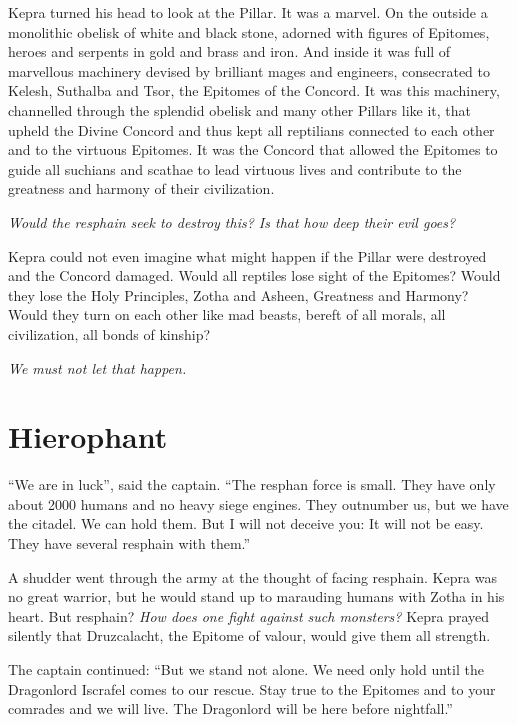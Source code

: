 \documentclass
  [a4paper,
   12pt,
   oneside
  ]%
  {article}
\begin{document}
Kepra turned his head to look at the Pillar. It was a marvel. On the outside a monolithic obelisk of white and black stone, adorned with figures of Epitomes, heroes and serpents in gold and brass and iron. And inside it was full of marvellous machinery devised by brilliant mages and engineers, consecrated to Kelesh, Suthalba and Tsor, the Epitomes of the Concord. It was this machinery, channelled through the splendid obelisk and many other Pillars like it, that upheld the Divine Concord and thus kept all reptilians connected to each other and to the virtuous Epitomes. It was the Concord that allowed the Epitomes to guide all suchians and scathae to lead virtuous lives and contribute to the greatness and harmony of their civilization.

\emph{Would the resphain seek to destroy this? Is that how deep their evil goes?}

Kepra could not even imagine what might happen if the Pillar were destroyed and the Concord damaged. Would all reptiles lose sight of the Epitomes? Would they lose the Holy Principles, Zotha and Asheen, Greatness and Harmony? Would they turn on each other like mad beasts, bereft of all morals, all civilization, all bonds of kinship?

\emph{
    We must not let that happen.%
     }



\section{Hierophant}
``We are in luck'', said the captain. ``The resphan force is small. They have only about 2000 humans and no heavy siege engines. They outnumber us, but we have the citadel. We can hold them. But I will not deceive you: It will not be easy. They have several resphain with them.'' 

A shudder went through the army at the thought of facing resphain. Kepra was no great warrior, but he would stand up to marauding humans with Zotha in his heart. 
But resphain? 
\emph{How does one fight against such monsters?}
Kepra prayed silently that Druzcalacht, the Epitome of valour, would give them all strength.

The captain continued: ``But we stand not alone. We need only hold until the Dragonlord Iscrafel comes to our rescue. Stay true to the Epitomes and to your comrades and we will live. The Dragonlord will be here before nightfall.''
\end{document}
